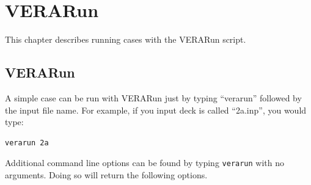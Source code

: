 %
%
%
\section{VERARun}  \label{chap:verarun}

This chapter describes running cases with the VERARun script.

\subsection{VERARun}

A simple case can be run with VERARun just by typing ``verarun'' followed by the input file name.
For example, if you input deck is called ``2a.inp'', you would type:
\begin{Verbatim}[fontsize=\small]
   verarun 2a
\end{Verbatim}

Additional command line options can be found by typing {\tt verarun} with no arguments.
Doing so will return the following options.

